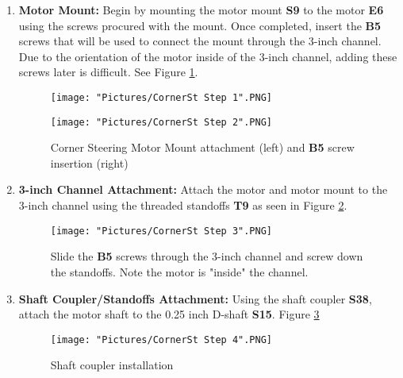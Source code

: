 \documentclass[12pt]{article}
\begin{document}
\begin{enumerate}
\item \textbf{Motor Mount:} Begin by mounting the motor mount \textbf{S9} to the motor \textbf{E6} using the screws procured with the mount. Once completed,
insert the \textbf{B5} screws that will be used to connect the mount through the 3-inch channel. Due to the orientation of the motor inside of the 3-inch channel, 
adding these screws later is difficult. See Figure \ref{corner steering step 1}.

\begin{figure}[H]
  \centering
  \begin{minipage}[b]{0.45\textwidth}
    \texttt{[image: "Pictures/CornerSt Step 1".PNG]}
  \end{minipage}
  \hfill
  \begin{minipage}[b]{0.45\textwidth}
    \texttt{[image: "Pictures/CornerSt Step 2".PNG]}
  \end{minipage}
  \caption{Corner Steering Motor Mount attachment (left) and \textbf{B5} screw insertion (right)}
  \label{corner steering step 1}
\end{figure}

\item \textbf{3-inch Channel Attachment:} Attach the motor and motor mount to the 3-inch channel using the threaded standoffs \textbf{T9} as seen in Figure \ref{corner steering 2}.

\begin{figure}[H]
  \centering
  \begin{minipage}[b]{0.45\textwidth}
    \texttt{[image: "Pictures/CornerSt Step 3".PNG]}
  \end{minipage}
  \caption{Slide the \textbf{B5} screws through the 3-inch channel and screw down the standoffs. Note the motor is "inside" the channel.}
  \label{corner steering 2}
\end{figure}

\item \textbf{Shaft Coupler/Standoffs Attachment:} Using the shaft coupler \textbf{S38}, attach the motor shaft to the 0.25 inch D-shaft \textbf{S15}.
Figure \ref{corner steering 3} 

\begin{figure}[H]
  \centering
  \begin{minipage}[b]{0.45\textwidth}
    \texttt{[image: "Pictures/CornerSt Step 4".PNG]}
  \end{minipage}
  \caption{Shaft coupler installation}
  \label{corner steering 3}
\end{figure}


\end{enumerate}
\end{document}
